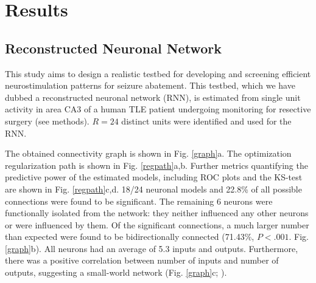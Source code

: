 \documentclass[journal,twoside,web]{ieeecolor}
\newcommand{\nn}{24}    %
\begin{document}
\section{Results \label{results}}

    \subsection{Reconstructed Neuronal Network}

This study aims to design a realistic testbed for developing and screening efficient neurostimulation patterns for seizure abatement.
This testbed, which we have dubbed a reconstructed neuronal network (RNN), is estimated from single unit activity in area CA3 of a human TLE patient undergoing monitoring for resective surgery (see methods).
$R=\nn{}$ distinct units were identified and used for the RNN. 

The obtained connectivity graph is shown in Fig. \ref{graph}a.
The optimization regularization path is shown in Fig. \ref{regpath}a,b.
Further metrics quantifying the predictive power of the estimated models, including ROC plots and the KS-test are shown in Fig. \ref{regpath}c,d.
18/\nn{} neuronal models and 22.8\% of all possible connections were found to be significant.
The remaining 6 neurons were functionally isolated from the network: they neither influenced any other neurons or were influenced by them.
Of the significant connections, a much larger number than expected were found to be bidirectionally connected (71.43\%, $P<.001$. Fig. \ref{graph}b).
All neurons had an average of 5.3 inputs and outputs.
Furthermore, there was a positive correlation between number of inputs and number of outputs, suggesting a small-world network (Fig. \ref{graph}c; \cite{sporns09,fallani14}).
\end{document}
